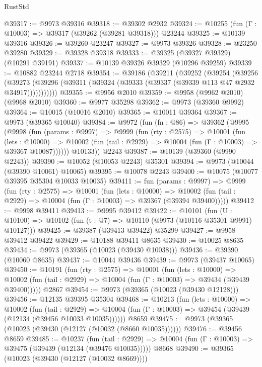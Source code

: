 \begin{lexlean}{RustStd}
\begin{coremodule}
@39317 := @9973 @39316
@39318 := @39302 @2932
@39324 := @10255 (fun (Γ : @10003) => @39317 (@39262 (@39281 @39318))) @23244
@39325 := @10139 @39316
@39326 := @39260 @23247
@39327 := @9973 @39326
@39328 := @23250 @39280
@39329 := @39328 @39318
@39333 := @39325 (@39327 @39329) (@10291 @39191)
@39337 := @10139 @39326 @39329 (@10296 @39259)
@39339 := @10882 @23244 @2718
@39354 := @39186
    (@39211
      (@39252
        (@39254
          (@39256
            (@39273 (@39296 (@39311 (@39324 (@39333 (@39337 (@39339 @113 @47 @2932 @34917)))))))))))
@39355 := @9956 @2010
@39359 := @9958 (@9962 @2010) (@9968 @2010)
@39360 := @9977 @35298
@39362 := @9973 (@39360 @9992)
@39364 := @10015 (@10016 @2010)
@39365 := @10011 @39364
@39367 := @9973 (@39365 @10040)
@39384 := @9972
    (fun (fn : @86) =>
    @39362
      (@9995
        (@9998
          (fun (params : @9997) =>
          @9999
            (fun (rty : @2575) =>
            @10001
              (fun (lets : @10000) =>
              @10002 (fun (tail : @2929) => @10004 (fun (Γ : @10003) => @39367 @10087))))))
        @10133))
    @2243
@39387 := @10139 (@39360 (@9990 @2243))
@39390 := @10052 (@10053 @2243) @35301
@39394 := @9973 (@10044 (@39390 @10061) @10065)
@39395 := @10078 @2243
@39400 := @10075 (@10077 @39395 @35304 @10033 @10035)
@39411 := fun (params : @9997) =>
  @9999
    (fun (rty : @2575) =>
    @10001
      (fun (lets : @10000) =>
      @10002 (fun (tail : @2929) => @10004 (fun (Γ : @10003) => @39367 (@39394 @39400)))))
@39412 := @9998 @39411
@39413 := @9995 @39412
@39422 := @10101
    (fun (U : @10100) => @10102 (fun (t : @7) => @10110 (@9973 (@10116 @35301 @9991) @10127)))
@39425 := @39387 (@39413 @39422) @35299
@39427 := @9958 @39412 @39422
@39429 := @10188 @39411 @8635
@39430 := @10025 @8635
@39434 := @9973 (@39365 (@10023 (@39430 @10038)))
@39436 := @39390 (@10060 @8635)
@39437 := @10044 @39436
@39439 := @9973 (@39437 @10065)
@39450 := @10191
    (fun (rty : @2575) =>
    @10001
      (fun (lets : @10000) =>
      @10002 (fun (tail : @2929) => @10004 (fun (Γ : @10003) => @39434 (@39439 @39400)))))
    @2867
@39454 := @9973 (@39365 (@10023 (@39430 @12128)))
@39456 := @12135 @39395 @35304
@39468 := @10213
    (fun (lets : @10000) =>
    @10002
      (fun (tail : @2929) =>
      @10004 (fun (Γ : @10003) => @39454 (@39439 (@12134 (@39456 @10033 @10035))))))
    @8659
@39475 := @9973 (@39365 (@10023 (@39430 (@12127 (@10032 (@8660 @10035))))))
@39476 := @39456 @8659
@39485 := @10237
    (fun (tail : @2929) => @10004 (fun (Γ : @10003) => @39475 (@39439 (@12134 (@39476 @10035)))))
    @8668
@39490 := @39365 (@10023 (@39430 (@12127 (@10032 @8669))))

\end{coremodule}
\end{lexlean}
